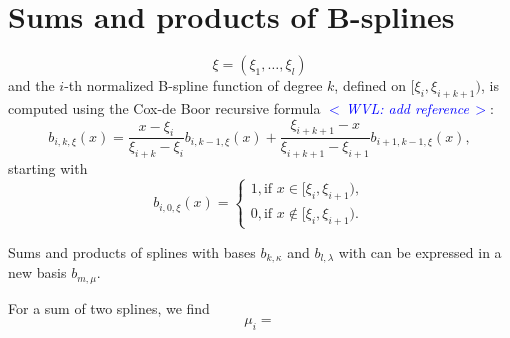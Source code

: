 \documentclass{article}
\newcommand{\commentWVL}[1]{\noindent \textcolor{blue}{\emph{$<\,$WVL: #1$\,>$}}}%
\newcommand{\feas}{\mathrm{f}}              %
\newcommand{\ppar}{\theta}                          %
\newcommand{\Ppar}{{\bm{\theta}}}                   %
\newcommand{\Pfeas}{\Ppar^\Pi_\feas}                %
\begin{document}





\appendix
\section{Sums and products of B-splines}

\[
    \xi = (\xi_1, \ldots, \xi_l)
\]
and the $i$-th normalized B-spline function of degree $k$, defined on $[\xi_i, \xi_{i+k+1})$, is computed using the Cox-de Boor recursive formula
\commentWVL{add reference}:
\[
    b_{i,k,\xi}(x) = \frac{x-\xi_i}{\xi_{i+k} - \xi_i}
    b_{i,k-1,\xi}(x) +
    \frac{\xi_{i+k+1}-x}{\xi_{i+k+1} - \xi_{i+1}}
    b_{i+1,k-1,\xi}(x) ,
\]
starting with
\[
    b_{i,0,\xi}(x)  =
    \begin{cases}
        1 , \text{if } x \in [\xi_i , \xi_{i+1} ) , \\
        0, \text{if } x \notin [\xi_i , \xi_{i+1} ) .
    \end{cases}
\]

Sums and products of splines with bases $b_{k,\kappa}$ and $b_{l,\lambda}$ with
can be expressed in a new basis $b_{m, \mu}$.

For a sum of two splines, we find
\[\mu_i = \]



\end{document}
